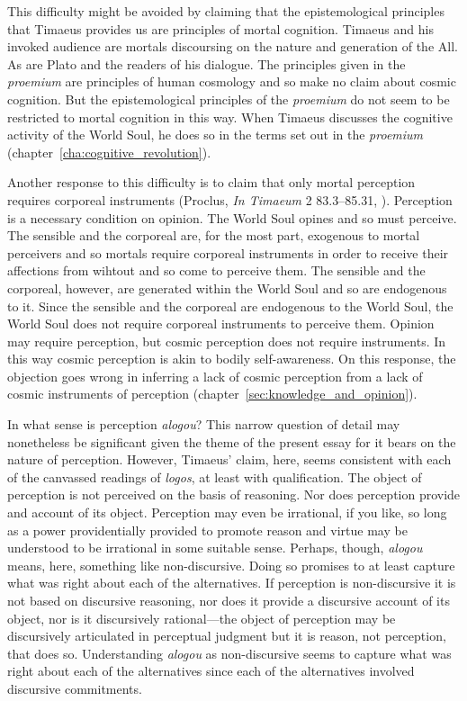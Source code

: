 This difficulty might be avoided by claiming that the epistemological principles that Timaeus provides us are principles of mortal cognition. Timaeus and his invoked audience are mortals discoursing on the nature and generation of the All. As are Plato and the readers of his dialogue. The principles given in the \emph{proemium} are principles of human cosmology and so make no claim about cosmic cognition. But the epistemological principles of the \emph{proemium} do not seem to be restricted to mortal cognition in this way. When Timaeus discusses the cognitive activity of the World Soul, he does so in the terms set out in the \emph{proemium} (chapter~\ref{cha:cognitive_revolution}).

Another response to this difficulty is to claim that only mortal perception requires corporeal instruments (Proclus, \emph{In Timaeum} 2 83.3–85.31, \citealt{Diehl:1903re}). Perception is a necessary condition on opinion. The World Soul opines and so must perceive. The sensible and the corporeal are, for the most part, exogenous to mortal perceivers and so mortals require corporeal instruments in order to receive their affections from wihtout and so come to perceive them. The sensible and the corporeal, however, are generated within the World Soul and so are endogenous to it. Since the sensible and the corporeal are endogenous to the World Soul, the World Soul does not require corporeal instruments to perceive them. Opinion may require perception, but cosmic perception does not require instruments. In this way cosmic perception is akin to bodily self-awareness. On this response, the objection goes wrong in inferring a lack of cosmic perception from a lack of cosmic instruments of perception (chapter~\ref{sec:knowledge_and_opinion}).

In what sense is perception \emph{alogou}? This narrow question of detail may nonetheless be significant given the theme of the present essay for it bears on the nature of perception. However, Timaeus' claim, here, seems consistent with each of the canvassed readings of \emph{logos}, at least with qualification. The object of perception is not perceived on the basis of reasoning. Nor does perception provide and account of its object. Perception may even be irrational, if you like, so long as a power providentially provided to promote reason and virtue may be understood to be irrational in some suitable sense. Perhaps, though, \emph{alogou} means, here, something like non-discursive. Doing so promises to at least capture what was right about each of the alternatives. If perception is non-discursive it is not based on discursive reasoning, nor does it provide a discursive account of its object, nor is it discursively rational---the object of perception may be discursively articulated in perceptual judgment but it is reason, not perception, that does so. Understanding \emph{alogou} as non-discursive seems to capture what was right about each of the alternatives since each of the alternatives involved discursive commitments.


